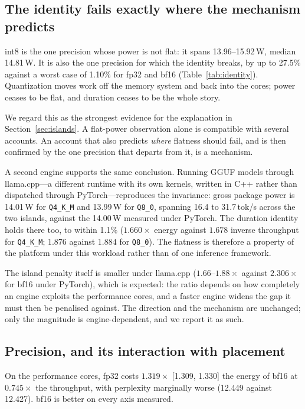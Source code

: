 \documentclass[journal]{IEEEtran}
\begin{document}
\subsection{The identity fails exactly where the mechanism predicts}
\label{sec:int8break}
int8 is the one precision whose power is not flat: it spans 13.96--15.92\,W,
median 14.81\,W. It is also the one precision for which the identity breaks,
by up to 27.5\% against a worst case of 1.10\% for fp32 and bf16
(Table~\ref{tab:identity}). Quantization moves work off the memory system and
back into the cores; power ceases to be flat, and duration ceases to be the
whole story.

We regard this as the strongest evidence for the explanation in
Section~\ref{sec:islands}. A flat-power observation alone is compatible with
several accounts. An account that also predicts \emph{where} flatness should
fail, and is then confirmed by the one precision that departs from it, is a
mechanism.

A second engine supports the same conclusion. Running GGUF models through
llama.cpp---a different runtime with its own kernels, written in C++ rather
than dispatched through PyTorch---reproduces the invariance: gross package
power is 14.01\,W for \texttt{Q4\_K\_M} and 13.99\,W for \texttt{Q8\_0},
spanning 16.4 to 31.7\,tok/s across the two islands, against the 14.00\,W
measured under PyTorch. The duration identity holds there too, to within 1.1\%
($1.660\times$ energy against $1.678$ inverse throughput for
\texttt{Q4\_K\_M}; $1.876$ against $1.884$ for \texttt{Q8\_0}). The flatness is
therefore a property of the platform under this workload rather than of one
inference framework.

The island penalty itself is smaller under llama.cpp ($1.66$--$1.88\times$
against $2.306\times$ for bf16 under PyTorch), which is expected: the ratio
depends on how completely an engine exploits the performance cores, and a
faster engine widens the gap it must then be penalised against. The direction
and the mechanism are unchanged; only the magnitude is engine-dependent, and we
report it as such.

\subsection{Precision, and its interaction with placement}
\label{sec:precision}
On the performance cores, fp32 costs $1.319\times$ [1.309, 1.330] the energy of
bf16 at $0.745\times$ the throughput, with perplexity marginally worse (12.449
against 12.427). bf16 is better on every axis measured.
\end{document}
